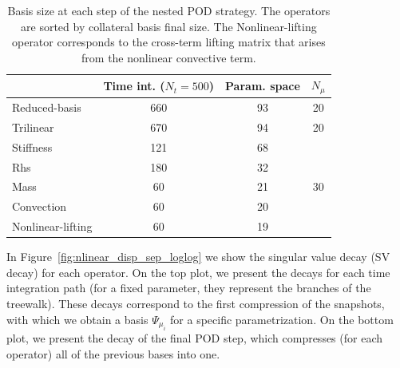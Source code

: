 \documentclass[../../thesis.tex]{subfiles}
\begin{document}

\begin{table}[h]
    \centering
    \caption{Basis size at each step of the nested POD strategy.
    The operators are sorted by collateral basis final size.
    The Nonlinear-lifting operator corresponds to the cross-term lifting matrix
    that arises from the nonlinear convective term.}
    \begin{tabular}{lccc}
        \toprule
        {} &  Time int. ($N_t = 500$) &  Param. space & $N_{\mu}$ \\
        \midrule
        Reduced-basis     &                     660 &          93 & 20 \\
        \midrule[0.01mm]
        Trilinear         &                     670 &          94 & 20 \\
        Stiffness         &                     121 &          68 & \multirow{5}{*}{30} \\
        Rhs               &                     180 &          32 &  \\
        Mass              &                      60 &          21 &  \\
        Convection        &                      60 &          20 &  \\
        Nonlinear-lifting &                      60 &          19 &  \\
        \bottomrule
    \end{tabular}        
    \label{tab:nlinear_disp_bases_size}
\end{table}
In Figure~\ref{fig:nlinear_disp_sep_loglog} we show 
the singular value decay (SV decay) for each operator.
On the top plot, we present the decays for each time integration path 
(for a fixed parameter, they represent the branches of the treewalk).
These decays correspond to the first compression of the snapshots, 
with which we obtain a basis $\Psi_{\mu_i}$ for a specific parametrization.
On the bottom plot, we present the decay of the final POD step, 
which compresses (for each operator) all of the previous bases into one.
\end{document}
